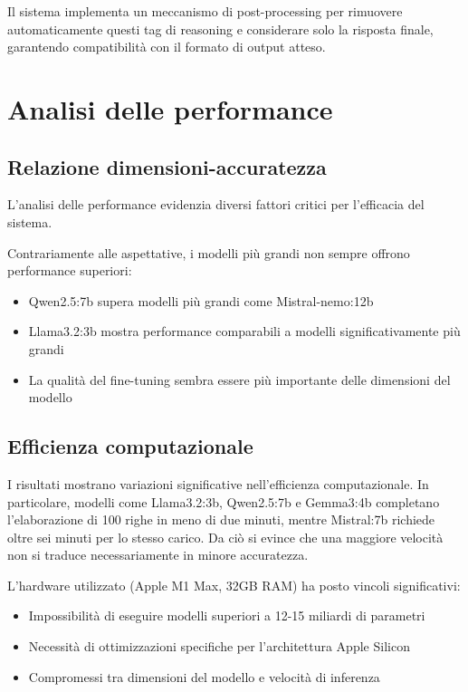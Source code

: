\documentclass[12pt]{report}
\begin{document}
Il sistema implementa un meccanismo di post-processing per rimuovere automaticamente questi tag di reasoning e considerare solo la risposta finale, garantendo compatibilità con il formato di output atteso.

\section{Analisi delle performance}
\label{sec:analisi_performance}

\subsection{Relazione dimensioni-accuratezza}
\label{subsec:relazione_dimensioni_accuratezza}

L'analisi delle performance evidenzia diversi fattori critici per l'efficacia del sistema.

Contrariamente alle aspettative, i modelli più grandi non sempre offrono performance superiori:
\begin{itemize}
    \item Qwen2.5:7b supera modelli più grandi come Mistral-nemo:12b
    \item Llama3.2:3b mostra performance comparabili a modelli significativamente più grandi
    \item La qualità del fine-tuning sembra essere più importante delle dimensioni del modello
\end{itemize}

\subsection{Efficienza computazionale}
\label{subsec:efficienza_computazionale}

I risultati mostrano variazioni significative nell'efficienza computazionale. In particolare, modelli come Llama3.2:3b, Qwen2.5:7b e Gemma3:4b completano l'elaborazione di 100 righe in meno di due minuti, mentre Mistral:7b richiede oltre sei minuti per lo stesso carico. Da ciò si evince che una maggiore velocità non si traduce necessariamente in minore accuratezza.


L'hardware utilizzato (Apple M1 Max, 32GB RAM) ha posto vincoli significativi:
\begin{itemize}
    \item Impossibilità di eseguire modelli superiori a 12-15 miliardi di parametri
    \item Necessità di ottimizzazioni specifiche per l'architettura Apple Silicon
    \item Compromessi tra dimensioni del modello e velocità di inferenza
\end{itemize}
\end{document}
